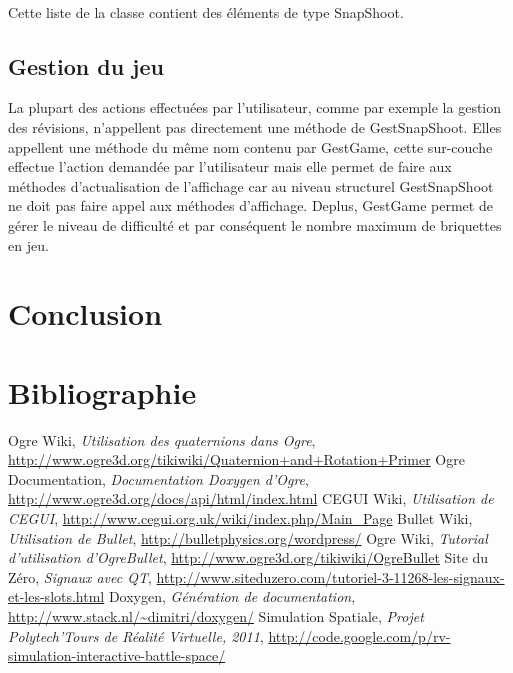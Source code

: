 \documentclass[frenchb,twoside]{EPURapport}
\begin{document}
			 \
			 
			 Cette liste de la classe contient des éléments de type SnapShoot.
			 
			
			 
        

    \section{Gestion du jeu}
    
		La plupart des actions effectuées par l'utilisateur, comme par exemple la gestion
		des révisions, n'appellent pas directement une méthode de GestSnapShoot. Elles appellent
		une méthode du même nom contenu par GestGame, cette sur-couche effectue l'action demandée
		par l'utilisateur mais elle permet de faire aux méthodes d'actualisation de l'affichage
		car au niveau structurel GestSnapShoot ne doit pas faire appel aux méthodes d'affichage.
		Deplus, GestGame permet de gérer le niveau de difficulté et par conséquent le nombre maximum
		de briquettes en jeu.
			 
        
\chapter{Conclusion}




\chapter{Bibliographie}

\begin{bibliographie}	
	 Ogre Wiki, \textit{Utilisation des quaternions dans Ogre}, \url{http://www.ogre3d.org/tikiwiki/Quaternion+and+Rotation+Primer}
	 Ogre Documentation, \textit{Documentation Doxygen d'Ogre}, \url{http://www.ogre3d.org/docs/api/html/index.html}
	 CEGUI Wiki, \textit{Utilisation de CEGUI}, \url{http://www.cegui.org.uk/wiki/index.php/Main_Page}
	 Bullet Wiki, \textit{Utilisation de Bullet}, \url{http://bulletphysics.org/wordpress/}
	 Ogre Wiki, \textit{Tutorial d'utilisation d'OgreBullet}, \url{http://www.ogre3d.org/tikiwiki/OgreBullet}
	 Site du Zéro, \textit{Signaux avec QT}, \url{http://www.siteduzero.com/tutoriel-3-11268-les-signaux-et-les-slots.html}
	 Doxygen, \textit{Génération de documentation}, \url{http://www.stack.nl/~dimitri/doxygen/}
	 Simulation Spatiale, \textit{Projet Polytech'Tours de Réalité Virtuelle, 2011}, \url{http://code.google.com/p/rv-simulation-interactive-battle-space/}
\end{bibliographie}	
\end{document}
